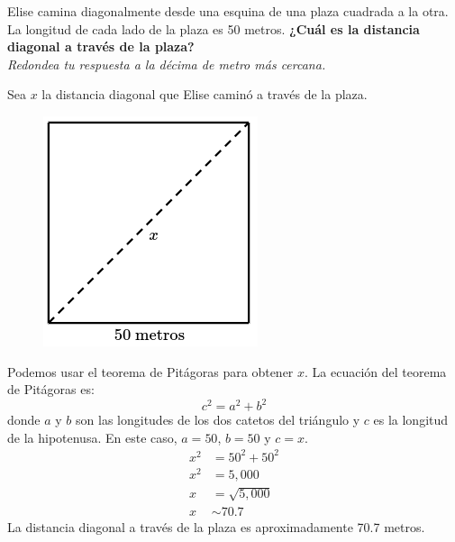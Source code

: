 Elise camina diagonalmente desde una esquina de una plaza cuadrada a la otra.
La longitud de cada lado de la plaza es 50 metros.
\textbf{¿Cuál es la distancia diagonal a través de la plaza?}\\
\textit{Redondea tu respuesta a la décima de metro más cercana.}


\begin{solutionbox}{15cm}
    Sea $x$ la distancia diagonal que Elise caminó a través de la plaza.
    \begin{figure}[H]
        \centering
        \includegraphics[width=0.2\linewidth]{../images/proverb_pitagoras_11.png}
        \caption{}
        \label{fig:proverb_pitagoras_11}
    \end{figure}
    Podemos usar el teorema de Pitágoras para obtener $x$.
    La ecuación del teorema de Pitágoras es:
    \[c^2=a^2+b^2\]
    donde $a$ y $b$ son las longitudes de los dos catetos del triángulo y $c$ es la longitud de la hipotenusa.
    En este caso, $a=50$, $b=50$ y $c=x$.
    \begin{align*}
        x^2 & =50^2+50^2    \\
        x^2 & =5,000        \\
        x   & =\sqrt{5,000} \\
        x   & \sim 70.7
    \end{align*}
    La distancia diagonal a través de la plaza es aproximadamente 70.7 metros.
\end{solutionbox}